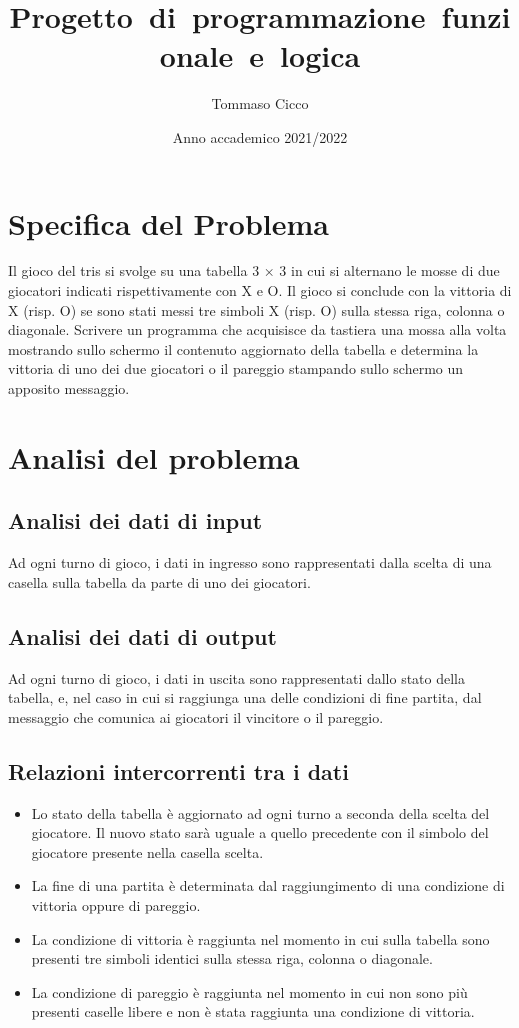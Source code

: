 \documentclass{article}
\title{Progetto~di~programmazione~funzionale~e~logica}
\author{Tommaso Cicco}
\date{\small Anno accademico 2021/2022}
\begin{document}
\maketitle
\newpage
\tableofcontents
\newpage
 
\section{Specifica del Problema}

Il gioco del tris si svolge su una tabella 3 × 3 in cui si alternano le mosse di due giocatori indicati rispettivamente con X e O. 
Il gioco si conclude con la vittoria di X (risp. O) se sono stati messi tre simboli X (risp. O) sulla stessa riga, colonna o diagonale. 
Scrivere un programma che acquisisce da tastiera una mossa alla volta mostrando sullo schermo il contenuto aggiornato della tabella 
e determina la vittoria di uno dei due giocatori o il pareggio stampando sullo schermo un apposito messaggio.
\newpage
\section{Analisi del problema}

\subsection{Analisi dei dati di input}

Ad ogni turno di gioco, i dati in ingresso sono rappresentati dalla scelta di una casella sulla tabella da parte di uno dei giocatori.
\subsection{Analisi dei dati di output}

Ad ogni turno di gioco, i dati in uscita sono rappresentati dallo stato della tabella, e, nel caso in cui si raggiunga una delle condizioni di fine partita, dal messaggio che comunica ai giocatori il vincitore o il pareggio.
\subsection{Relazioni intercorrenti tra i dati}

\begin{itemize}
    \item Lo stato della tabella è aggiornato ad ogni turno a seconda della scelta del giocatore. Il nuovo stato sarà uguale a quello precedente con il simbolo del giocatore presente nella casella scelta.
    \item La fine di una partita è determinata dal raggiungimento di una condizione di vittoria oppure di pareggio.
    \item La condizione di vittoria è raggiunta nel momento in cui sulla tabella sono presenti tre simboli identici sulla stessa riga, colonna o diagonale.
    \item La condizione di pareggio è raggiunta nel momento in cui non sono più presenti caselle libere e non è stata raggiunta una condizione di vittoria.
\end{itemize}
\newpage
\end{document}
